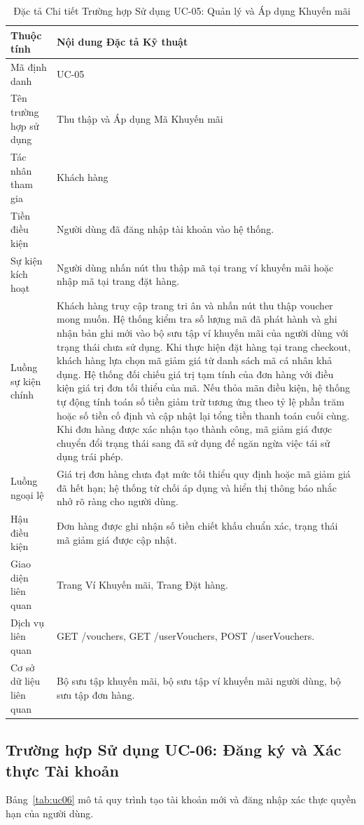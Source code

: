 \begin{table}[H]
\centering
\caption{Đặc tả Chi tiết Trường hợp Sử dụng UC-05: Quản lý và Áp dụng Khuyến mãi}
\label{tab:uc05}
\begin{tabularx}{\textwidth}{p{3.5cm}X}
\toprule
\textbf{Thuộc tính} & \textbf{Nội dung Đặc tả Kỹ thuật} \\
\midrule
Mã định danh & UC-05 \\
Tên trường hợp sử dụng & Thu thập và Áp dụng Mã Khuyến mãi \\
Tác nhân tham gia & Khách hàng \\
Tiền điều kiện & Người dùng đã đăng nhập tài khoản vào hệ thống. \\
Sự kiện kích hoạt & Người dùng nhấn nút thu thập mã tại trang ví khuyến mãi hoặc nhập mã tại trang đặt hàng. \\
Luồng sự kiện chính & 
Khách hàng truy cập trang tri ân và nhấn nút thu thập voucher mong muốn.
Hệ thống kiểm tra số lượng mã đã phát hành và ghi nhận bản ghi mới vào bộ sưu tập ví khuyến mãi của người dùng với trạng thái chưa sử dụng.
Khi thực hiện đặt hàng tại trang checkout, khách hàng lựa chọn mã giảm giá từ danh sách mã cá nhân khả dụng.
Hệ thống đối chiếu giá trị tạm tính của đơn hàng với điều kiện giá trị đơn tối thiểu của mã.
Nếu thỏa mãn điều kiện, hệ thống tự động tính toán số tiền giảm trừ tương ứng theo tỷ lệ phần trăm hoặc số tiền cố định và cập nhật lại tổng tiền thanh toán cuối cùng.
Khi đơn hàng được xác nhận tạo thành công, mã giảm giá được chuyển đổi trạng thái sang đã sử dụng để ngăn ngừa việc tái sử dụng trái phép. \\
Luồng ngoại lệ & Giá trị đơn hàng chưa đạt mức tối thiểu quy định hoặc mã giảm giá đã hết hạn; hệ thống từ chối áp dụng và hiển thị thông báo nhắc nhở rõ ràng cho người dùng. \\
Hậu điều kiện & Đơn hàng được ghi nhận số tiền chiết khấu chuẩn xác, trạng thái mã giảm giá được cập nhật. \\
Giao diện liên quan & Trang Ví Khuyến mãi, Trang Đặt hàng. \\
Dịch vụ liên quan & GET /vouchers, GET /userVouchers, POST /userVouchers. \\
Cơ sở dữ liệu liên quan & Bộ sưu tập khuyến mãi, bộ sưu tập ví khuyến mãi người dùng, bộ sưu tập đơn hàng. \\
\bottomrule
\end{tabularx}
\end{table}

\subsection{Trường hợp Sử dụng UC-06: Đăng ký và Xác thực Tài khoản}
Bảng~\ref{tab:uc06} mô tả quy trình tạo tài khoản mới và đăng nhập xác thực quyền hạn của người dùng.

